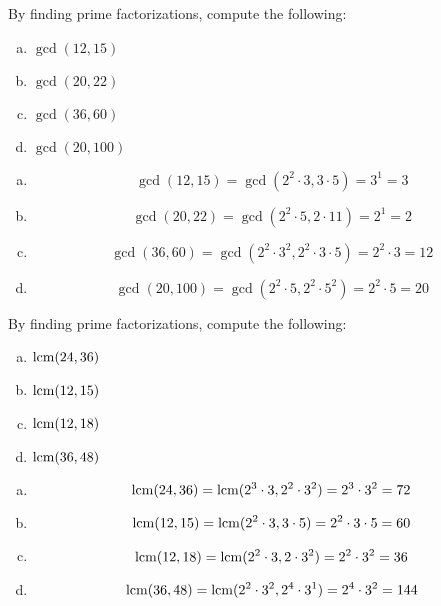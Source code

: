 \documentclass[11pt,letterpaper]{article}
\begin{document}
\newpage



 By finding prime factorizations, compute the following:
	\begin{enumerate}[(a)]
	\item $\gcd(12, 15)$
	\item $\gcd(20, 22)$
	\item $\gcd(36, 60)$
	\item $\gcd(20, 100)$
	\end{enumerate} \pspace

\sol
\begin{enumerate}[(a)]
\item 
	\[
	\gcd(12, 15)= \gcd(2^2 \cdot 3, 3 \cdot 5)= 3^1= 3
	\] \pspace

\item 
	\[
	\gcd(20, 22)= \gcd(2^2 \cdot 5, 2 \cdot 11)= 2^1= 2
	\] \pspace

\item 
	\[
	\gcd(36, 60)= \gcd(2^2 \cdot 3^2, 2^2 \cdot 3 \cdot 5)= 2^2 \cdot 3= 12
	\] \pspace

\item 
	\[
	\gcd(20, 100)= \gcd(2^2 \cdot 5, 2^2 \cdot 5^2)= 2^2 \cdot 5= 20
	\]
\end{enumerate}



\newpage



 By finding prime factorizations, compute the following:
	\begin{enumerate}[(a)]
	\item $\operatorname{lcm}(24, 36)$
	\item $\operatorname{lcm}(12, 15)$
	\item $\operatorname{lcm}(12, 18)$
	\item $\operatorname{lcm}(36, 48)$
	\end{enumerate} \pspace

\sol
\begin{enumerate}[(a)]
\item 
	\[
	\operatorname{lcm}(24, 36)= \operatorname{lcm}(2^3 \cdot 3, 2^2 \cdot 3^2)= 2^3 \cdot 3^2= 72
	\] \pspace

\item 
	\[
	\operatorname{lcm}(12, 15)= \operatorname{lcm}(2^2 \cdot 3, 3 \cdot 5)= 2^2 \cdot 3 \cdot 5= 60 
	\] \pspace

\item 
	\[
	\operatorname{lcm}(12, 18)= \operatorname{lcm}(2^2 \cdot 3, 2 \cdot 3^2)= 2^2 \cdot 3^2= 36
	\] \pspace

\item 
	\[
	\operatorname{lcm}(36, 48)= \operatorname{lcm}(2^2 \cdot 3^2, 2^4 \cdot 3^1)= 2^4 \cdot 3^2= 144
	\]
\end{enumerate}
\end{document}

